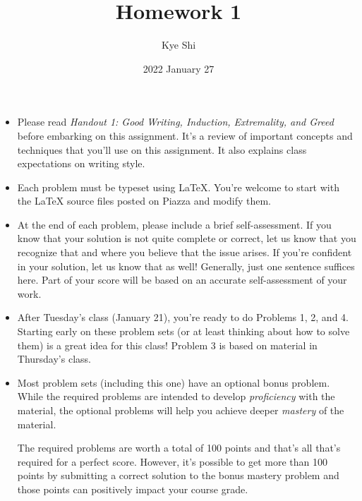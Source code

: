 \documentclass{ks-pset}
\title{Homework 1}
\author{Kye Shi}
\date{2022 January 27}
\begin{document}
\begin{itemize}
  \item Please read \emph{Handout 1:  Good Writing, Induction, Extremality, and
    Greed} before embarking on this assignment.  It's a review of important
    concepts and techniques that you'll use on this assignment.  It also
    explains class expectations on writing style.

  \item Each problem must be typeset using \LaTeX.  You're welcome to start
    with the \LaTeX{} source files posted on Piazza and modify them.

  \item At the end of each problem, please include a brief self-assessment.  If
    you know that your solution is not quite complete or correct, let us know
    that you recognize that and where you believe that the issue arises.  If
    you're confident in your solution, let us know that as well! Generally,
    just one sentence suffices here.  Part of your score will be based on an
    accurate self-assessment of your work.

  \item After Tuesday's class (January 21), you're ready to do Problems 1, 2,
    and 4.  Starting early on these problem sets (or at least thinking about how
    to solve them) is a great idea for this class! Problem 3 is based on
    material in Thursday's class.

  \item Most problem sets (including this one) have an optional bonus problem.
    While the required problems are intended to develop \emph{proficiency} with
    the material, the optional problems will help you achieve deeper
    \emph{mastery} of the material.

  The required problems are worth a total of 100 points and that's all that's
  required for a perfect score.  However, it's possible to get more than 100
  points by submitting a correct solution to the bonus mastery problem and
  those points can positively impact your course grade.
\end{itemize}

\newpage
\end{document}
